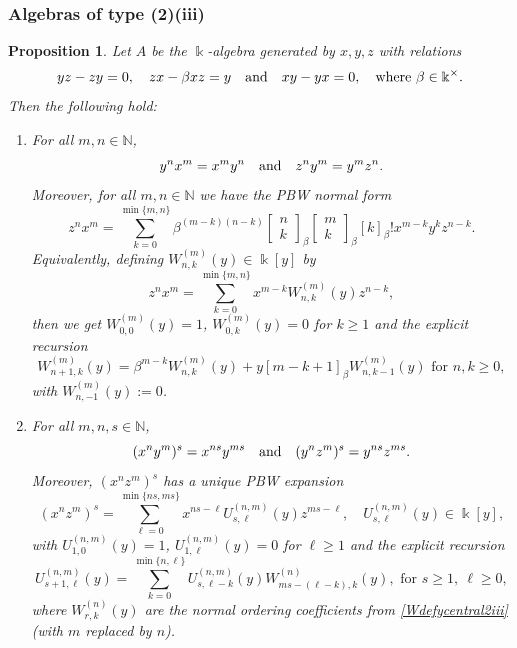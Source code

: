 \documentclass{amsart}
\newtheorem{proposition}[theorem]{Proposition}
\theoremstyle{definition}
\theoremstyle{remark}
\numberwithin{equation}{section}
\begin{document}
\subsubsection{Algebras of type (2)(iii)}

\begin{proposition}\label{case(2)(iii)}
Let $A$ be the $\Bbbk$-algebra generated by $x,y,z$ with relations
\[
yz - zy=0,\quad zx - \beta xz = y \quad {\rm and} \quad xy - yx = 0, \quad {\rm where} \ \beta \in \Bbbk^{\times}. 
\]
Then the following hold:
\begin{enumerate}
\item[\rm (1)] For all $m,n\in\mathbb{N}$,
\[
y^n x^m = x^m y^n \quad {\rm and} \quad z^n y^m = y^m z^n.
\]
Moreover, for all $m,n\in\mathbb{N}$ we have the PBW normal form
\begin{equation}\label{znxmclosedycentral2iii}
z^n x^m =\sum_{k=0}^{\min\{m,n\}}
\beta^{(m-k)(n-k)}\begin{bmatrix} n\\ k\end{bmatrix}_{\beta}
\begin{bmatrix} m\\ k\end{bmatrix}_{\beta}[k]_{\beta}!x^{m-k}y^{k}z^{n-k}.
\end{equation}
Equivalently, defining $W^{(m)}_{n,k}(y)\in\Bbbk[y]$ by
\begin{equation}\label{Wdefycentral2iii}
z^n x^m=\sum_{k=0}^{\min\{m,n\}} x^{m-k}W^{(m)}_{n,k}(y)z^{n-k},
\end{equation}
then we get $W^{(m)}_{0,0}(y)=1$, $W^{(m)}_{0,k}(y)=0$ for $k\ge 1$ and the explicit recursion
\begin{equation}\label{Wrecycentral2iii}
W^{(m)}_{n+1,k}(y) =\beta^{m-k} W^{(m)}_{n,k}(y)+y [m-k+1]_\beta W^{(m)}_{n,k-1}(y) \text{ for } n, k\ge 0,
\end{equation}
with $W^{(m)}_{n,-1}(y):=0$.

\item[\rm (2)] For all $m,n,s\in\mathbb{N}$,
\[
(x^n y^m)^s=x^{ns}y^{ms} \quad {\rm and} \quad (y^n z^m)^s=y^{ns}z^{ms}.
\]
Moreover, $(x^n z^m)^s$ has a unique PBW expansion
\begin{equation}\label{xnzmUycentral2iii}
(x^n z^m)^s=\sum_{\ell=0}^{\min\{ns,ms\}} x^{ns-\ell}U^{(n,m)}_{s,\ell}(y)z^{ms-\ell}, \quad U^{(n,m)}_{s,\ell}(y)\in\Bbbk[y],
\end{equation}
with $U^{(n,m)}_{1,0}(y)=1$, $U^{(n,m)}_{1,\ell}(y)=0$ for $\ell\ge 1$ and the explicit recursion
\begin{equation}\label{Urecycentral2iii}
U^{(n,m)}_{s+1,\ell}(y) =\sum_{k=0}^{\min\{n,\ell\}}U^{(n,m)}_{s,\ell-k}(y) W^{(n)}_{ms-(\ell-k),k}(y), \text{ for } s\ge 1,\ \ell\ge 0,
\end{equation}
where $W^{(n)}_{r,k}(y)$ are the normal ordering coefficients from \eqref{Wdefycentral2iii} {\rm (}with $m$ replaced by $n${\rm )}.


\end{enumerate}
\end{proposition}
\end{document}
